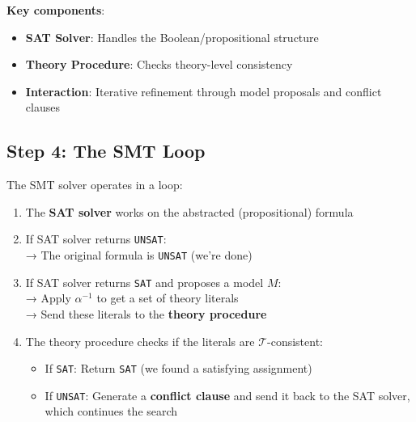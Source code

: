 \documentclass[11pt,a4paper]{article}
\theoremstyle{definition}
\theoremstyle{plain}
\theoremstyle{remark}
\begin{document}
\vspace{0.5em}



\textbf{Key components}:

\begin{itemize}

    \item \textbf{SAT Solver}: Handles the Boolean/propositional structure

    \item \textbf{Theory Procedure}: Checks theory-level consistency

    \item \textbf{Interaction}: Iterative refinement through model proposals and conflict clauses

\end{itemize}



\subsection{Step 4: The SMT Loop}



The SMT solver operates in a loop:



\begin{enumerate}

    \item The \textbf{SAT solver} works on the abstracted (propositional) formula



    \item If SAT solver returns \texttt{UNSAT}: \\

    → The original formula is \texttt{UNSAT} (we're done)



    \item If SAT solver returns \texttt{SAT} and proposes a model $M$: \\

    → Apply $\alpha^{-1}$ to get a set of theory literals \\

    → Send these literals to the \textbf{theory procedure}



    \item The theory procedure checks if the literals are $\mathcal{T}$-consistent:

    \begin{itemize}

        \item If \texttt{SAT}: Return \texttt{SAT} (we found a satisfying assignment)

        \item If \texttt{UNSAT}: Generate a \textbf{conflict clause} and send it back to the SAT solver, which continues the search

    \end{itemize}

\end{enumerate}
\end{document}
